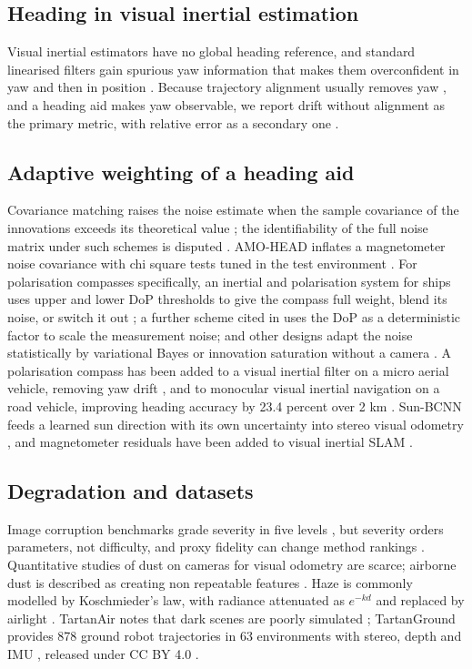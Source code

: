\documentclass[conference]{IEEEtran}
\begin{document}
\subsection{Heading in visual inertial estimation}
Visual inertial estimators \cite{mourikis, openvins, vinsmono, orbslam3} have no global heading reference, and standard linearised filters gain spurious yaw information that makes them overconfident in yaw and then in position \cite{hesch, huang_fej, limourikis}. Because trajectory alignment usually removes yaw \cite{zhang18}, and a heading aid makes yaw observable, we report drift without alignment as the primary metric, with relative error as a secondary one \cite{sturm, geiger}.

\subsection{Adaptive weighting of a heading aid}
Covariance matching raises the noise estimate when the sample covariance of the innovations exceeds its theoretical value \cite{zhang20}; the identifiability of the full noise matrix under such schemes is disputed \cite{zhang20}. AMO-HEAD inflates a magnetometer noise covariance with chi square tests tuned in the test environment \cite{amohead}. For polarisation compasses specifically, an inertial and polarisation system for ships uses upper and lower DoP thresholds to give the compass full weight, blend its noise, or switch it out \cite{zhang22}; a further scheme cited in \cite{sun25} uses the DoP as a deterministic factor to scale the measurement noise; and other designs adapt the noise statistically by variational Bayes or innovation saturation without a camera \cite{zhao, sun25}. A polarisation compass has been added to a visual inertial filter on a micro aerial vehicle, removing yaw drift \cite{steidle}, and to monocular visual inertial navigation on a road vehicle, improving heading accuracy by 23.4 percent over 2 km \cite{chu23}. Sun-BCNN feeds a learned sun direction with its own uncertainty into stereo visual odometry \cite{sunbcnn}, and magnetometer residuals have been added to visual inertial SLAM \cite{joshi}.

\subsection{Degradation and datasets}
Image corruption benchmarks grade severity in five levels \cite{imagenetc}, but severity orders parameters, not difficulty, and proxy fidelity can change method rankings \cite{failuredrift}. Quantitative studies of dust on cameras for visual odometry are scarce; airborne dust is described as creating non repeatable features \cite{khattak}. Haze is commonly modelled by Koschmieder's law, with radiance attenuated as $e^{-kd}$ and replaced by airlight \cite{cheng}. TartanAir notes that dark scenes are poorly simulated \cite{tartanair}; TartanGround provides 878 ground robot trajectories in 63 environments with stereo, depth and IMU \cite{tartanground}, released under CC BY 4.0 \cite{tg_hf}.
\end{document}
